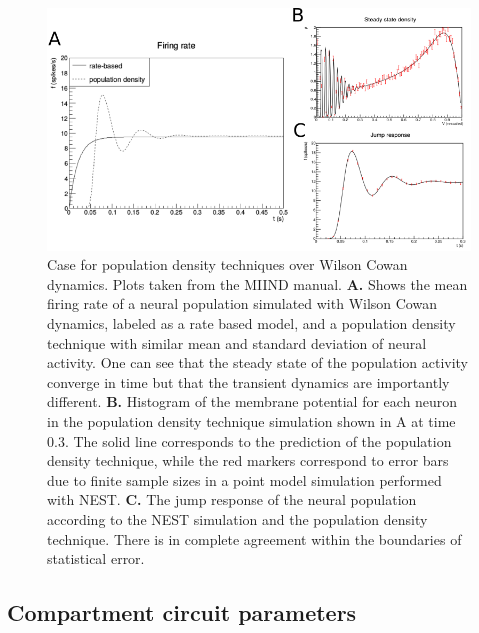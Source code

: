 \documentclass[10pt]{article}
\begin{document}
\begin{figure}[h!]
  \begin{center}
    \includegraphics[width=0.70\columnwidth]{figures/case_for_pdt1/case_for_pdt1}
    \caption{{\label{pdt_case} Case for population density techniques
        over Wilson Cowan dynamics. Plots taken from the MIIND manual.
        \textbf{A.} Shows the mean firing rate of a neural population simulated
        with Wilson Cowan dynamics, labeled as a rate based model, and
        a population density technique with similar mean and standard
        deviation of neural activity. One can see that the steady
        state of the population activity converge in time but that the
        transient dynamics are importantly different. \textbf{B.} Histogram of
        the membrane potential for each neuron in the population
        density technique simulation shown in A at time 0.3. The solid
        line corresponds to the prediction of the population density
        technique, while the red markers correspond to error bars due
        to finite sample sizes in a point model simulation performed
        with NEST. \textbf{C.} The jump response of the neural population
        according to the NEST simulation and the population density
        technique. There is in complete agreement within the boundaries
        of statistical error.%
      }}
  \end{center}
\end{figure}

\subsection{Compartment circuit parameters}\label{compartment-circuit-parameters}
\end{document}
